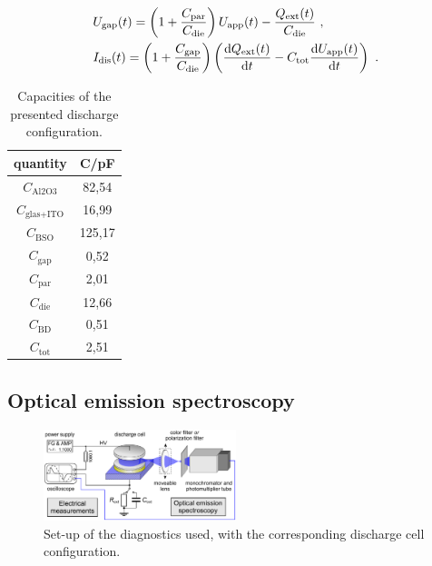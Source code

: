 \documentclass[a4paper,10pt,twoside]{article}
\newcommand{\diff}{\textnormal{d}}
\newcommand{\ix}[1]{_\text{#1}}
\begin{document}
				\begin{align*}
					 &U\ix{gap}(t)=\left(1+\frac{C\ix{par}}{C\ix{die}}\right)U\ix{app}(t)-\frac{Q\ix{ext}(t)}{C\ix{die}} \,\, , \\
					 &I\ix{dis}(t)=\left(1+\frac{C\ix{gap}}{C\ix{die}}\right)\left(\frac{\diff Q\ix{ext}(t)}{\diff t}-C\ix{tot}\frac{\diff U\ix{app}(t)}{\diff t}\right) \,\, .
				\end{align*}	

				\begin{table}
					\centering
					\begin{tabular}{c|c}
						quantity & C/pF \\ \hline\hline
						$C\ix{Al2O3}$ &  82,54 \\ \hline
						$C\ix{glas+ITO}$ & 16,99 \\ \hline
						$C\ix{BSO}$ & 125,17 \\ \hline
						$C\ix{gap}$ & 0,52 \\ \hline
						$C\ix{par}$ & 2,01 \\ \hline
						$C\ix{die}$ & 12,66 \\ \hline
						$C\ix{BD}$ & 0,51 \\ \hline
						$C\ix{tot}$ & 2,51 \\
					\end{tabular}
					\caption{Capacities of the presented discharge configuration.}\label{tab:capac}
				\end{table}
	
		\subsection{Optical emission spectroscopy}\label{subsec:oes}
		
				\begin{figure}
					\centering
					\includegraphics[width=0.5\textwidth]{figures/setup/setup.pdf}
					\caption{Set-up of the diagnostics used, with the corresponding discharge cell configuration.}
					\label{img:diag}
				\end{figure}
		
\end{document}

